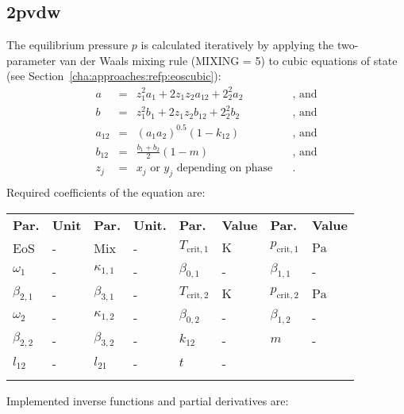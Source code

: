\subsection{2pvdw}
\label{cha:approaches:abs:mic:2pvdw}
%
The equilibrium pressure $p$ is calculated iteratively by applying the two-parameter van der Waals mixing rule (MIXING = 5) to cubic equations of state (see Section~\ref{cha:approaches:refp:eoscubic}):
%
\begin{equation*}
	\begin{split}
		a &=& z_1^2 a_1 + 2 z_1 z_2 a_{12} + 2_2^2 a_2 & \quad\text{, and} \\
		b &=& z_1^2 b_1 + 2 z_1 z_2 b_{12} + 2_2^2 b_2 & \quad\text{, and} \\
		a_{12} &=& \left( a_1 a_2 \right) ^{0.5} \left(1 - k_{12} \right) & \quad\text{, and} \\
		b_{12} &=& \frac{ b_1 + b_2 }{2} \left(1 - m \right) & \quad\text{, and} \\
		z_j &=& x_j \textrm { or } y_j \textrm{ depending on phase} & \quad\text{.} \\
	\end{split}
\end{equation*}
%
Required coefficients of the equation are:
%
\begin{longtable}[l]{ll|ll|ll|ll}
	\toprule
	\addlinespace
	\textbf{Par.} & \textbf{Unit} & \textbf{Par.} &	\textbf{Unit.} & \textbf{Par.} & \textbf{Value} & \textbf{Par.} & \textbf{Value} \\
	\addlinespace
	\midrule
	\endhead
	
	\bottomrule
	\endfoot
	\bottomrule
	\endlastfoot
	\addlinespace
	
	EoS & - & Mix & - &$T_\mathrm{crit,1}$ & $\si{\kelvin}$ &$p_\mathrm{crit,1}$ & $\si{\pascal}$ \\
	$\omega_{1}$ & - &$\kappa_{1,1}$ & - &$\beta_{0,1}$ & - &$\beta_{1,1}$ & - \\
	$\beta_{2,1}$ & - &$\beta_{3,1}$ & - &$T_\mathrm{crit,2}$ & $\si{\kelvin}$ &$p_\mathrm{crit,2}$ & $\si{\pascal}$ \\
	$\omega_{2}$ & - &$\kappa_{1,2}$ & - &$\beta_{0,2}$ & - &$\beta_{1,2}$ & - \\
	$\beta_{2,2}$ & - &$\beta_{3,2}$ & - &$k_{12}$ & - &$m$ & - \\
	$l_{12}$ & - & $l_{21}$ & - & $t$ & - & &  \\
	
	\addlinespace
\end{longtable}
%
Implemented inverse functions and partial derivatives are:
